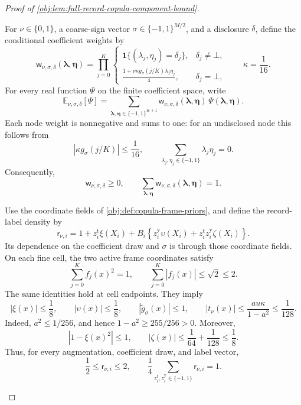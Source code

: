 \documentclass[11pt]{article}
\begin{document}
\begin{proof}[Proof of \cref{obj:lem:full-record-copula-component-bound}]
\begin{enumerate}
For \(\nu\in\{0,1\}\), a coarse-sign vector
\(\sigma\in\{-1,1\}^{M/2}\), and a disclosure \(\delta\), define the conditional coefficient weights by
\[
\mathsf w_{\nu,\sigma,\delta}
 (\boldsymbol\lambda,\boldsymbol\eta)
 =
 \prod_{j=0}^{K}
 \begin{cases}
 \mathbf1\{(\lambda_j,\eta_j)=\delta_j\},&\delta_j\ne\bot,\\[2pt]
 \displaystyle
 \frac{1+\nu\kappa g_\sigma(j/K)\lambda_j\eta_j}{4},
 &\delta_j=\bot,
 \end{cases}
\qquad \kappa=\frac1{16}.
\]
For every real function \(\Psi\) on the finite coefficient space, write
\[
\mathbb E_{\nu,\sigma,\delta}[\Psi]
 =
 \sum_{\boldsymbol\lambda,\boldsymbol\eta\in\{-1,1\}^{K+1}}
 \mathsf w_{\nu,\sigma,\delta}
 (\boldsymbol\lambda,\boldsymbol\eta)\,
 \Psi(\boldsymbol\lambda,\boldsymbol\eta).
\]
Each node weight is nonnegative and sums to one: for an undisclosed node this follows from
\[
|\kappa g_\sigma(j/K)|\le\frac1{16},
\qquad
\sum_{\lambda_j,\eta_j\in\{-1,1\}}\lambda_j\eta_j=0.
\]
Consequently,
\[
\mathsf w_{\nu,\sigma,\delta}\ge0,
\qquad
\sum_{\boldsymbol\lambda,\boldsymbol\eta}
 \mathsf w_{\nu,\sigma,\delta}
 (\boldsymbol\lambda,\boldsymbol\eta)=1.
\]

Use the coordinate fields of \cref{obj:def:copula-frame-priors}, and define the record-label density by
\[
\mathsf r_{\nu,i}
 =
 1+z_i^{\mathrm t}\xi(X_i)
 +B_i\left\{
 z_i^{\mathrm y}\upsilon(X_i)
 +z_i^{\mathrm t}z_i^{\mathrm y}\zeta(X_i)
 \right\}.
\]
Its dependence on the coefficient draw and \(\sigma\) is through those coordinate fields. On each fine cell, the two active frame coordinates satisfy
\[
\sum_{j=0}^{K}f_j(x)^2=1,
\qquad
\sum_{j=0}^{K}|f_j(x)|\le\sqrt2\le2.
\]
The same identities hold at cell endpoints. They imply
\[
|\xi(x)|\le\frac18,
\qquad
|\upsilon(x)|\le\frac18,
\qquad
|\widetilde g_\sigma(x)|\le1,
\qquad
|t_\nu(x)|
 \le\frac{au\kappa}{1-a^2}\le\frac1{128}.
\]
Indeed, \(a^2\le1/256\), and hence \(1-a^2\ge255/256>0\). Moreover,
\[
|1-\xi(x)^2|\le1,
\qquad
|\zeta(x)|
 \le\frac1{64}+\frac1{128}\le\frac18.
\]
Thus, for every augmentation, coefficient draw, and label vector,
\[
\frac12\le\mathsf r_{\nu,i}\le2,
\qquad
\frac14\sum_{z_i^{\mathrm t},z_i^{\mathrm y}\in\{-1,1\}}
 \mathsf r_{\nu,i}=1.
\]


\end{enumerate}
\end{proof}
\end{document}
